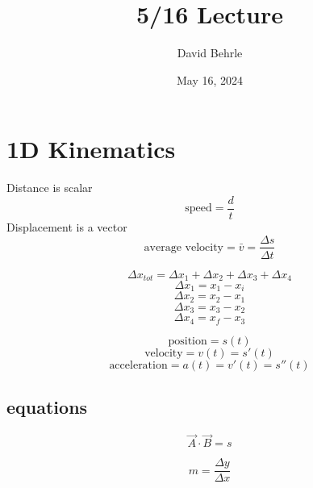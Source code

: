\documentclass[a4paper]{article}
\title{5/16 Lecture}
\author{David Behrle}
\begin{document}
\date{May 16, 2024}
\maketitle
    \section{1D Kinematics}

    Distance is scalar
    \begin{equation}
        \text{speed} = \frac{d}{t}
    \end{equation}
    Displacement is a vector
    \begin{equation}
        \text{average velocity} = \bar{v} = \frac{\Delta s}{\Delta t}
    \end{equation}

    \begin{equation}
        \Delta x_{tot} = \Delta x_1 + \Delta x_2 + \Delta x_3 + \Delta x_4
    \end{equation}
    \begin{equation}
        \Delta x_1 = x_1 - x_i
    \end{equation}
    \begin{equation}
        \Delta x_2 = x_2 - x_1
    \end{equation}
    \begin{equation}
        \Delta x_3 = x_3 - x_2
    \end{equation}
    \begin{equation}
        \Delta x_4 = x_f - x_3
    \end{equation}

    \begin{equation}
        \text{position} = s(t)
    \end{equation}
    \begin{equation}
        \text{velocity} = v(t) = s'(t)
    \end{equation}
    \begin{equation}
        \text{acceleration} = a(t) = v'(t) = s''(t)
    \end{equation}

    \subsection{equations}
    \begin{equation}
        \vec{A} \cdot \vec{B} = s
    \end{equation}

    \begin{equation}
        m = \frac{\Delta y}{\Delta x}
    \end{equation}
 
\end{document}
